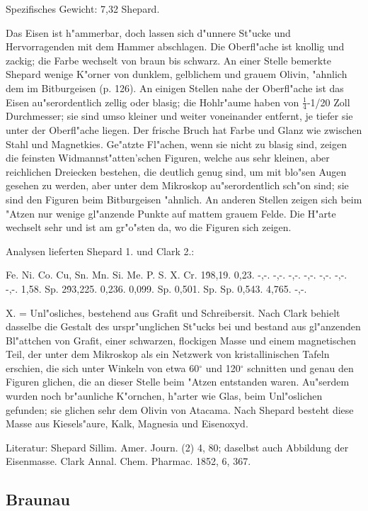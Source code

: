\documentclass[a4paper, 11pt, oneside]{article}
\begin{document}
Spezifisches Gewicht: 7,32 Shepard.

Das Eisen ist h"ammerbar, doch lassen sich d"unnere St"ucke und Hervorragenden mit dem Hammer abschlagen. Die Oberfl"ache ist knollig und zackig; die Farbe wechselt von braun bis schwarz. An einer Stelle bemerkte Shepard wenige K"orner von dunklem, gelblichem und grauem Olivin, "ahnlich dem im Bitburgeisen (p. 126). An einigen Stellen nahe der Oberfl"ache ist das Eisen au"serordentlich zellig oder blasig; die Hohlr"aume haben von $\frac{1}{4}$-1/20 Zoll Durchmesser; sie sind umso kleiner und weiter voneinander entfernt, je tiefer sie unter der Oberfl"ache liegen. Der frische Bruch hat Farbe und Glanz wie zwischen Stahl und Magnetkies. Ge"atzte Fl"achen, wenn sie nicht zu blasig sind, zeigen die feinsten Widmannst"atten'schen Figuren, welche aus sehr kleinen, aber reichlichen Dreiecken bestehen, die deutlich genug sind, um mit blo"sen Augen gesehen zu werden, aber unter dem Mikroskop au"serordentlich sch"on sind; sie sind den Figuren beim Bitburgeisen "ahnlich. An anderen Stellen zeigen sich beim "Atzen nur wenige gl"anzende Punkte auf mattem grauem Felde. Die H"arte wechselt sehr und ist am gr"o"sten da, wo die Figuren sich zeigen.

Analysen lieferten Shepard 1. und Clark 2.:

Fe. Ni. Co. Cu, Sn. Mn. Si. Me. P. S. X. Cr.  
1\. 98,19. 0,23. -,-. -,-. -,-. -,-. -,-. -,-. -,-. 1,58. Sp.  
2\. 93,225. 0,236. 0,099. Sp. 0,501. Sp. Sp. 0,543. 4,765. -,-.

X. = Unl"osliches, bestehend aus Grafit und Schreibersit. Nach Clark behielt dasselbe die Gestalt des urspr"unglichen St"ucks bei und bestand aus gl"anzenden Bl"attchen von Grafit, einer schwarzen, flockigen Masse und einem magnetischen Teil, der unter dem Mikroskop als ein Netzwerk von kristallinischen Tafeln erschien, die sich unter Winkeln von etwa 60$^\circ$ und 120$^\circ$ schnitten und genau den Figuren glichen, die an dieser Stelle beim "Atzen entstanden waren. Au"serdem wurden noch br"aunliche K"ornchen, h"arter wie Glas, beim Unl"oslichen gefunden; sie glichen sehr dem Olivin von Atacama. Nach Shepard besteht diese Masse aus Kiesels"aure, Kalk, Magnesia und Eisenoxyd.

Literatur: Shepard Sillim. Amer. Journ. (2) 4, 80; daselbst auch Abbildung der Eisenmasse. Clark Annal. Chem. Pharmac. 1852, 6, 367.

\subsection{Braunau}
\normalsize
\end{document}
